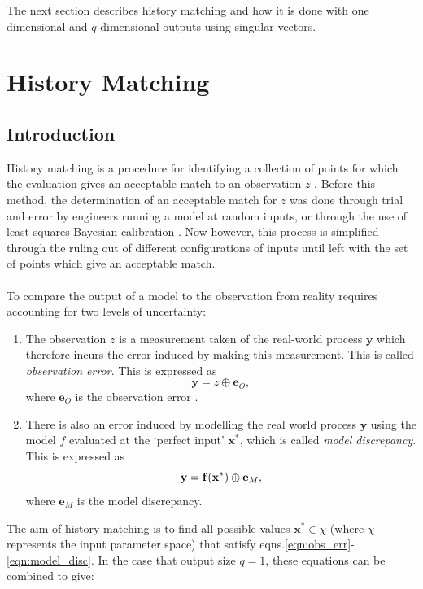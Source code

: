 \documentclass{article}
\newcommand{\numOutputs}{q}
\newcommand{\simulator}{f}
\newcommand{\inputVec}{\mathbf{x}}
\newcommand{\outputVec}{\mathbf{y}}
\newcommand{\obs}{z}
\newcommand{\obsErrorqD}{\mathbf{e}_O}
\newcommand{\modelDiscqD}{\mathbf{e}_M}
\newcommand{\paramSpace}{\chi}
\begin{document}
The next section describes history matching and how it is done with one dimensional and $\numOutputs$-dimensional outputs using singular vectors.
\section{History Matching}
\label{section:hm}
\subsection{Introduction}
History matching is a procedure for identifying a collection of points for which the evaluation gives an acceptable match to an observation $\obs$ \citep{Vernon2010}. Before this method, the determination of an acceptable match for $\obs$ was done through trial and error by engineers running a model at random inputs, or through the use of least-squares Bayesian calibration \citep{Craig1996}. Now however, this process is simplified through the ruling out of different configurations of inputs until left with the set of points which give an acceptable match.\\\\
To compare the output of a model to the observation from reality requires accounting for two levels of uncertainty: 
\begin{enumerate}
    \item The observation $\obs$ is a measurement taken of the real-world process $\outputVec$ which therefore incurs the error induced by making this measurement. This is called {\it observation error}. This is expressed as
    \begin{equation}
        \label{eqn:obs_err}
        \outputVec = {\obs} \oplus \obsErrorqD,
    \end{equation}
    where $\obsErrorqD$ is the observation error \citep{Bower2010}.

    \item There is also an error induced by modelling the real world process $\outputVec$ using the model $\simulator$ evaluated at the `perfect input' $\inputVec^*$, which is called {\it model discrepancy}. This is expressed as
    \begin{equation}
        \label{eqn:model_disc}
        {\bf \outputVec = \simulator(\inputVec^*)} \oplus \modelDiscqD,
    \end{equation}
    where $\modelDiscqD$ is the model discrepancy.
\end{enumerate}
The aim of history matching is to find all possible values $\inputVec^* \in \paramSpace$ (where $\paramSpace$ represents the input parameter space) that satisfy eqns.\eqref{eqn:obs_err}-\eqref{eqn:model_disc}. In the case that output size $\numOutputs=1$, these equations can be combined to give:
\end{document}
